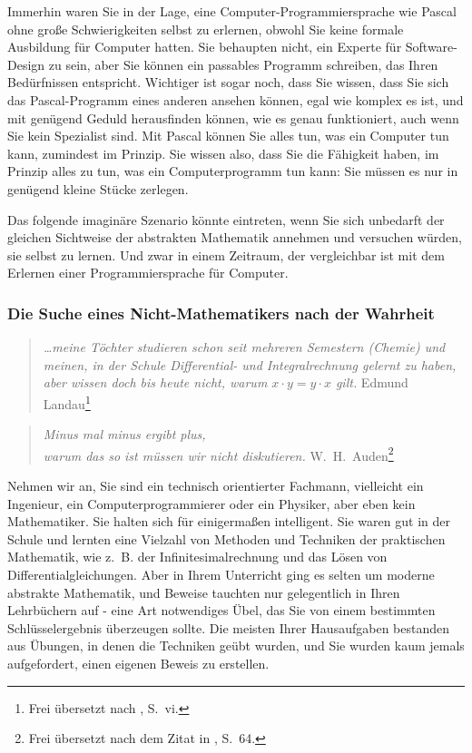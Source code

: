 Immerhin waren Sie in der Lage, eine Computer-Programmiersprache wie Pascal ohne große Schwierigkeiten selbst zu erlernen, obwohl Sie keine formale Ausbildung für Computer hatten.  Sie behaupten nicht, ein Experte für Software-Design zu sein, aber Sie können ein passables Programm schreiben, das Ihren Bedürfnissen entspricht.  Wichtiger ist sogar noch, dass Sie wissen, dass Sie sich das Pascal-Programm eines anderen ansehen können, egal wie komplex es ist, und mit genügend Geduld herausfinden können, wie es genau funktioniert, auch wenn Sie kein Spezialist sind.  Mit Pascal können Sie alles tun, was ein Computer tun kann, zumindest im Prinzip.  Sie wissen also, dass Sie die Fähigkeit haben, im Prinzip alles zu tun, was ein Computerprogramm tun kann: Sie müssen es nur in genügend kleine Stücke zerlegen.

Das folgende imaginäre Szenario könnte eintreten, wenn Sie sich unbedarft der gleichen Sichtweise der abstrakten Mathematik annehmen und versuchen würden, sie selbst zu lernen.  Und zwar in einem Zeitraum, der vergleichbar ist mit dem Erlernen einer Programmiersprache für Computer.


\subsubsection{Die Suche eines Nicht-Mathematikers nach der Wahrheit}

\begin{quote}
  {\em \ldots meine Töchter studieren schon seit mehreren Semestern (Chemie) und meinen, in der Schule Differential- und Integralrechnung gelernt zu haben, aber wissen doch bis heute nicht, warum $x\cdot y=y\cdot x$ gilt.}
    \flushright\sc Edmund Landau\footnote{Frei übersetzt nach \cite{Landau}, S.~vi.}\
\end{quote}

\begin{quote}
  {\em Minus mal minus ergibt plus,\\
   warum das so ist müssen wir nicht diskutieren.}
    \flushright\sc W.\ H.\ Auden\footnote{Frei übersetzt nach dem Zitat in \cite{Guillen}, S.~64.}\\
\end{quote}\index{Auden, W.\ H.}\index{Guillen, Michael}

Nehmen wir an, Sie sind ein technisch orientierter Fachmann, vielleicht ein Ingenieur, ein Computerprogrammierer oder ein Physiker, aber eben kein Mathematiker.  Sie halten sich für einigermaßen intelligent.  Sie waren gut in der Schule und lernten eine Vielzahl von Methoden und Techniken der praktischen Mathematik, wie z.~B. der Infinitesimalrechnung und das Lösen von Differentialgleichungen.  Aber in Ihrem Unterricht ging es selten um moderne abstrakte Mathematik, und Beweise tauchten nur gelegentlich in Ihren Lehrbüchern auf - eine Art notwendiges Übel, das Sie von einem bestimmten Schlüsselergebnis überzeugen sollte.  Die meisten Ihrer Hausaufgaben bestanden aus Übungen, in denen die Techniken geübt wurden, und Sie wurden kaum jemals aufgefordert, einen eigenen Beweis zu erstellen.

